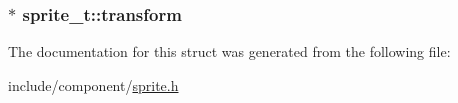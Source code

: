 \subsubsection[{\texorpdfstring{transform}{transform}}]{$\ast$ sprite\+\_\+t\+::transform}\hypertarget{structsprite__t_a75832530a950033696778cb7f566b357}{}\label{structsprite__t_a75832530a950033696778cb7f566b357}


The documentation for this struct was generated from the following file\+:\begin{DoxyCompactItemize}
\item 
include/component/\hyperlink{sprite_8h}{sprite.\+h}\end{DoxyCompactItemize}
